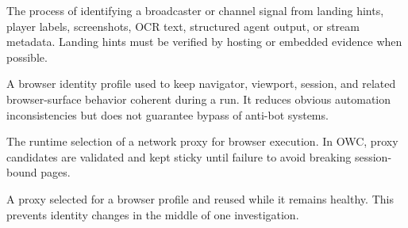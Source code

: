 \begin{description}[leftmargin=4.55cm,labelwidth=4.15cm,labelsep=0.4cm,style=sameline,itemsep=0.34em,topsep=0.35em,parsep=0pt]
  \item[Channel detection] The process of identifying a broadcaster or channel signal from landing hints, player labels, screenshots, OCR text, structured agent output, or stream metadata. Landing hints must be verified by hosting or embedded evidence when possible.
  \item[Fingerprint profile] A browser identity profile used to keep navigator, viewport, session, and related browser-surface behavior coherent during a run. It reduces obvious automation inconsistencies but does not guarantee bypass of anti-bot systems.
  \item[Proxy rotation] The runtime selection of a network proxy for browser execution. In OWC, proxy candidates are validated and kept sticky until failure to avoid breaking session-bound pages.
  \item[Sticky proxy] A proxy selected for a browser profile and reused while it remains healthy. This prevents identity changes in the middle of one investigation.
\end{description}
\endgroup
\clearpage
